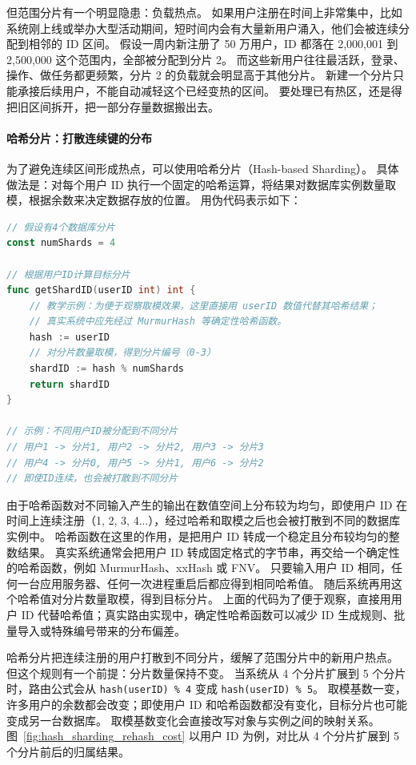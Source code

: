 但范围分片有一个明显隐患：负载热点。
如果用户注册在时间上非常集中，比如系统刚上线或举办大型活动期间，短时间内会有大量新用户涌入，他们会被连续分配到相邻的 ID 区间。
假设一周内新注册了 50 万用户，ID 都落在 2,000,001 到 2,500,000 这个范围内，全部被分配到分片 2。
而这些新用户往往最活跃，登录、操作、做任务都更频繁，分片 2 的负载就会明显高于其他分片。
新建一个分片只能承接后续用户，不能自动减轻这个已经变热的区间。
要处理已有热区，还是得把旧区间拆开，把一部分存量数据搬出去。

\paragraph{哈希分片：打散连续键的分布}

为了避免连续区间形成热点，可以使用哈希分片（Hash-based Sharding）。
具体做法是：对每个用户 ID 执行一个固定的哈希运算，将结果对数据库实例数量取模，根据余数来决定数据存放的位置。
用伪代码表示如下：

\begin{tcolorbox}[title=哈希分片的映射计算]
\begin{lstlisting}[style=codeblock, language=go]
// 假设有4个数据库分片
const numShards = 4

// 根据用户ID计算目标分片
func getShardID(userID int) int {
    // 教学示例：为便于观察取模效果，这里直接用 userID 数值代替其哈希结果；
    // 真实系统中应先经过 MurmurHash 等确定性哈希函数。
    hash := userID
    // 对分片数量取模，得到分片编号（0-3）
    shardID := hash % numShards
    return shardID
}

// 示例：不同用户ID被分配到不同分片
// 用户1 -> 分片1, 用户2 -> 分片2, 用户3 -> 分片3
// 用户4 -> 分片0, 用户5 -> 分片1, 用户6 -> 分片2
// 即使ID连续，也会被打散到不同分片
\end{lstlisting}
\end{tcolorbox}

由于哈希函数对不同输入产生的输出在数值空间上分布较为均匀，即使用户 ID 在时间上连续注册（1, 2, 3, 4...），经过哈希和取模之后也会被打散到不同的数据库实例中。
哈希函数在这里的作用，是把用户 ID 转成一个稳定且分布较均匀的整数结果。
真实系统通常会把用户 ID 转成固定格式的字节串，再交给一个确定性的哈希函数，例如 MurmurHash、xxHash 或 FNV。
只要输入用户 ID 相同，任何一台应用服务器、任何一次进程重启后都应得到相同哈希值。
随后系统再用这个哈希值对分片数量取模，得到目标分片。
上面的代码为了便于观察，直接用用户 ID 代替哈希值；真实路由实现中，确定性哈希函数可以减少 ID 生成规则、批量导入或特殊编号带来的分布偏差。

哈希分片把连续注册的用户打散到不同分片，缓解了范围分片中的新用户热点。
但这个规则有一个前提：分片数量保持不变。
当系统从 4 个分片扩展到 5 个分片时，路由公式会从 \texttt{hash(userID) \% 4} 变成 \texttt{hash(userID) \% 5}。
取模基数一变，许多用户的余数都会改变；即使用户 ID 和哈希函数都没有变化，目标分片也可能变成另一台数据库。
取模基数变化会直接改写对象与实例之间的映射关系。
图~\ref{fig:hash_sharding_rehash_cost} 以用户 ID 为例，对比从 4 个分片扩展到 5 个分片前后的归属结果。

